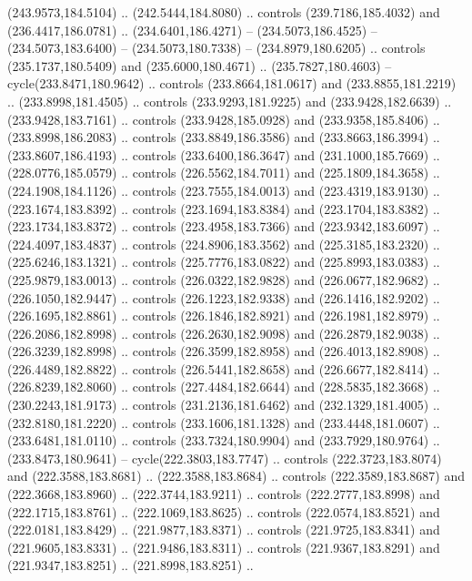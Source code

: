 \begin{scope}[cm={{1.25,0.0,0.0,-1.25,(0.0,442.91375)}}]
    (243.9573,184.5104) .. (242.5444,184.8080) .. controls (239.7186,185.4032) and
    (236.4417,186.0781) .. (234.6401,186.4271) -- (234.5073,186.4525) --
    (234.5073,183.6400) -- (234.5073,180.7338) -- (234.8979,180.6205) .. controls
    (235.1737,180.5409) and (235.6000,180.4671) .. (235.7827,180.4603) --
    cycle(233.8471,180.9642) .. controls (233.8664,181.0617) and
    (233.8855,181.2219) .. (233.8998,181.4505) .. controls (233.9293,181.9225) and
    (233.9428,182.6639) .. (233.9428,183.7161) .. controls (233.9428,185.0928) and
    (233.9358,185.8406) .. (233.8998,186.2083) .. controls (233.8849,186.3586) and
    (233.8663,186.3994) .. (233.8607,186.4193) .. controls (233.6400,186.3647) and
    (231.1000,185.7669) .. (228.0776,185.0579) .. controls (226.5562,184.7011) and
    (225.1809,184.3658) .. (224.1908,184.1126) .. controls (223.7555,184.0013) and
    (223.4319,183.9130) .. (223.1674,183.8392) .. controls (223.1694,183.8384) and
    (223.1704,183.8382) .. (223.1734,183.8372) .. controls (223.4958,183.7366) and
    (223.9342,183.6097) .. (224.4097,183.4837) .. controls (224.8906,183.3562) and
    (225.3185,183.2320) .. (225.6246,183.1321) .. controls (225.7776,183.0822) and
    (225.8993,183.0383) .. (225.9879,183.0013) .. controls (226.0322,182.9828) and
    (226.0677,182.9682) .. (226.1050,182.9447) .. controls (226.1223,182.9338) and
    (226.1416,182.9202) .. (226.1695,182.8861) .. controls (226.1846,182.8921) and
    (226.1981,182.8979) .. (226.2086,182.8998) .. controls (226.2630,182.9098) and
    (226.2879,182.9038) .. (226.3239,182.8998) .. controls (226.3599,182.8958) and
    (226.4013,182.8908) .. (226.4489,182.8822) .. controls (226.5441,182.8658) and
    (226.6677,182.8414) .. (226.8239,182.8060) .. controls (227.4484,182.6644) and
    (228.5835,182.3668) .. (230.2243,181.9173) .. controls (231.2136,181.6462) and
    (232.1329,181.4005) .. (232.8180,181.2220) .. controls (233.1606,181.1328) and
    (233.4448,181.0607) .. (233.6481,181.0110) .. controls (233.7324,180.9904) and
    (233.7929,180.9764) .. (233.8473,180.9641) -- cycle(222.3803,183.7747) ..
    controls (222.3723,183.8074) and (222.3588,183.8681) .. (222.3588,183.8684) ..
    controls (222.3589,183.8687) and (222.3668,183.8960) .. (222.3744,183.9211) ..
    controls (222.2777,183.8998) and (222.1715,183.8761) .. (222.1069,183.8625) ..
    controls (222.0574,183.8521) and (222.0181,183.8429) .. (221.9877,183.8371) ..
    controls (221.9725,183.8341) and (221.9605,183.8331) .. (221.9486,183.8311) ..
    controls (221.9367,183.8291) and (221.9347,183.8251) .. (221.8998,183.8251) ..

\end{scope}
